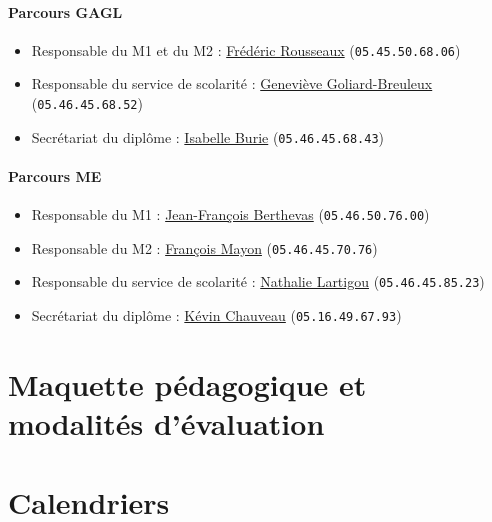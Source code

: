 \documentclass[a4paper,11pt]{article}
\begin{document}
\paragraph{Parcours GAGL}

\begin{itemize}
	\item Responsable du M1 et du M2 : \href{mailto:frederic.rousseaux@univ-lr.fr}{Frédéric Rousseaux} (\texttt{05.45.50.68.06})
	\item Responsable du service de scolarité : \href{mailto:genevieve.breuleux@univ-lr.fr}{Geneviève Goliard-Breuleux} (\texttt{05.46.45.68.52})
	\item Secrétariat du diplôme : \href{mailto:isabelle.burie@univ-lr.fr}{Isabelle Burie} (\texttt{05.46.45.68.43})
\end{itemize}

\paragraph{Parcours ME}

\begin{itemize}
	\item Responsable du M1 : \href{mailto:jean-francois.berthevas@univ-lr.fr}{Jean-François Berthevas} (\texttt{05.46.50.76.00})
	\item Responsable du M2 : \href{mailto:francois.mayon@univ-lr.fr}{François Mayon} (\texttt{05.46.45.70.76})
	\item Responsable du service de scolarité : \href{mailto:nathalie.lartigou}{Nathalie Lartigou} (\texttt{05.46.45.85.23})
	\item Secrétariat du diplôme : \href{mailto:kevin.chauveau}{Kévin Chauveau} (\texttt{05.16.49.67.93})
\end{itemize}

\section{Maquette pédagogique et modalités d'évaluation}\label{Maquette}

\section{Calendriers}\label{Calendrier}
\end{document}
